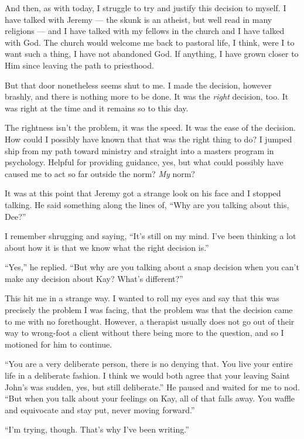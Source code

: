 And then, as with today, I struggle to try and justify this decision to myself. I have talked with Jeremy --- the skunk is an atheist, but well read in many religions --- and I have talked with my fellows in the church and I have talked with God. The church would welcome me back to pastoral life, I think, were I to want such a thing, I have not abandoned God. If anything, I have grown closer to Him since leaving the path to priesthood.

But that door nonetheless seems shut to me. I made the decision, however brashly, and there is nothing more to be done. It was the \emph{right} decision, too. It was right at the time and it remains so to this day.

The rightness isn't the problem, it was the speed. It was the ease of the decision. How could I possibly have known that that was the right thing to do? I jumped ship from my path toward ministry and straight into a masters program in psychology. Helpful for providing guidance, yes, but what could possibly have caused me to act so far outside the norm? \emph{My} norm?

It was at this point that Jeremy got a strange look on his face and I stopped talking. He said something along the lines of, ``Why are you talking about this, Dee?''

I remember shrugging and saying, ``It's still on my mind. I've been thinking a lot about how it is that we know what the right decision is.''

``Yes,'' he replied. ``But why are you talking about a snap decision when you can't make any decision about Kay? What's different?''

This hit me in a strange way. I wanted to roll my eyes and say that this was precisely the problem I was facing, that the problem was that the decision came to me with no forethought. However, a therapist usually does not go out of their way to wrong-foot a client without there being more to the question, and so I motioned for him to continue.

``You are a very deliberate person, there is no denying that. You live your entire life in a deliberate fashion. I think we would both agree that your leaving Saint John's was sudden, yes, but still deliberate.'' He paused and waited for me to nod. ``But when you talk about your feelings on Kay, all of that falls away. You waffle and equivocate and stay put, never moving forward.''

``I'm trying, though. That's why I've been writing.''

